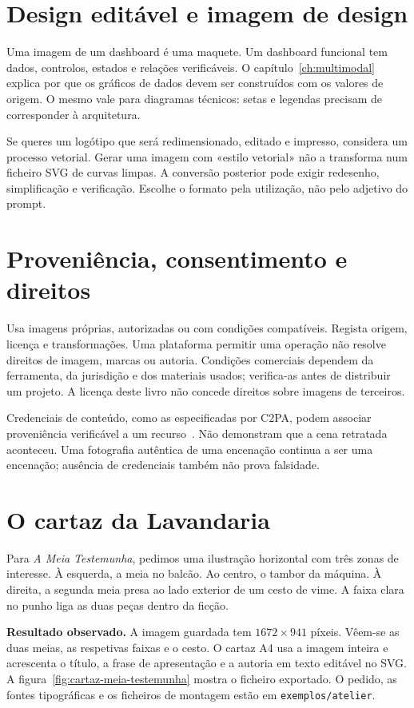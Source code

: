 \section{Design editável e imagem de design}
Uma imagem de um dashboard é uma maquete. Um dashboard funcional tem dados, controlos, estados e relações verificáveis. O capítulo~\ref{ch:multimodal} explica por que os gráficos de dados devem ser construídos com os valores de origem. O mesmo vale para diagramas técnicos: setas e legendas precisam de corresponder à arquitetura.

Se queres um logótipo que será redimensionado, editado e impresso, considera um processo vetorial. Gerar uma imagem com «estilo vetorial» não a transforma num ficheiro SVG de curvas limpas. A conversão posterior pode exigir redesenho, simplificação e verificação. Escolhe o formato pela utilização, não pelo adjetivo do prompt.

\section{Proveniência, consentimento e direitos}
Usa imagens próprias, autorizadas ou com condições compatíveis. Regista origem, licença e transformações. Uma plataforma permitir uma operação não resolve direitos de imagem, marcas ou autoria. Condições comerciais dependem da ferramenta, da jurisdição e dos materiais usados; verifica-as antes de distribuir um projeto. A licença deste livro não concede direitos sobre imagens de terceiros.

Credenciais de conteúdo, como as especificadas por C2PA, podem associar proveniência verificável a um recurso~\citep{c2pa22}. Não demonstram que a cena retratada aconteceu. Uma fotografia autêntica de uma encenação continua a ser uma encenação; ausência de credenciais também não prova falsidade.

\section{O cartaz da Lavandaria}
Para \emph{A Meia Testemunha}, pedimos uma ilustração horizontal com três zonas de interesse. À esquerda, a meia no balcão. Ao centro, o tambor da máquina. À direita, a segunda meia presa ao lado exterior de um cesto de vime. A faixa clara no punho liga as duas peças dentro da ficção.

\textbf{Resultado observado.} A imagem guardada tem $1672 \times 941$ píxeis. Vêem-se as duas meias, as respetivas faixas e o cesto. O cartaz A4 usa a imagem inteira e acrescenta o título, a frase de apresentação e a autoria em texto editável no SVG. A figura~\ref{fig:cartaz-meia-testemunha} mostra o ficheiro exportado. O pedido, as fontes tipográficas e os ficheiros de montagem estão em \nolinkurl{exemplos/atelier}.


